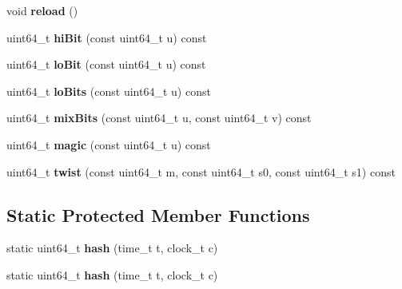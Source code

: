 \begin{DoxyCompactItemize}
\item 
\hypertarget{classMTRand_a1d5fcb69d83f4d2fd653883c8352f86c}{void {\bfseries reload} ()}\label{classMTRand_a1d5fcb69d83f4d2fd653883c8352f86c}

\item 
\hypertarget{classMTRand_ad4a7632a7738a3b7fcf8dc3a082f4bca}{uint64\-\_\-t {\bfseries hi\-Bit} (const uint64\-\_\-t u) const }\label{classMTRand_ad4a7632a7738a3b7fcf8dc3a082f4bca}

\item 
\hypertarget{classMTRand_a1cd2fc67f5bbcd20138d34772e2e5816}{uint64\-\_\-t {\bfseries lo\-Bit} (const uint64\-\_\-t u) const }\label{classMTRand_a1cd2fc67f5bbcd20138d34772e2e5816}

\item 
\hypertarget{classMTRand_ad69ec4672916b2fb55f6b10d71d15515}{uint64\-\_\-t {\bfseries lo\-Bits} (const uint64\-\_\-t u) const }\label{classMTRand_ad69ec4672916b2fb55f6b10d71d15515}

\item 
\hypertarget{classMTRand_a27a04b4c5852664be5da01569678725c}{uint64\-\_\-t {\bfseries mix\-Bits} (const uint64\-\_\-t u, const uint64\-\_\-t v) const }\label{classMTRand_a27a04b4c5852664be5da01569678725c}

\item 
\hypertarget{classMTRand_a718b184ca793fa2dfde467c7c9c70892}{uint64\-\_\-t {\bfseries magic} (const uint64\-\_\-t u) const }\label{classMTRand_a718b184ca793fa2dfde467c7c9c70892}

\item 
\hypertarget{classMTRand_a6d191303b615284e333378edfea1d1d7}{uint64\-\_\-t {\bfseries twist} (const uint64\-\_\-t m, const uint64\-\_\-t s0, const uint64\-\_\-t s1) const }\label{classMTRand_a6d191303b615284e333378edfea1d1d7}

\end{DoxyCompactItemize}
\subsection*{Static Protected Member Functions}
\begin{DoxyCompactItemize}
\item 
\hypertarget{classMTRand_a1b1914765ae18effdd454ee5dc490855}{static uint64\-\_\-t {\bfseries hash} (time\-\_\-t t, clock\-\_\-t c)}\label{classMTRand_a1b1914765ae18effdd454ee5dc490855}

\item 
\hypertarget{classMTRand_aa63dc2de67aab8cd274b1cb3cfdb6815}{static uint64\-\_\-t {\bfseries hash} (time\-\_\-t t, clock\-\_\-t c)}\label{classMTRand_aa63dc2de67aab8cd274b1cb3cfdb6815}

\end{DoxyCompactItemize}
